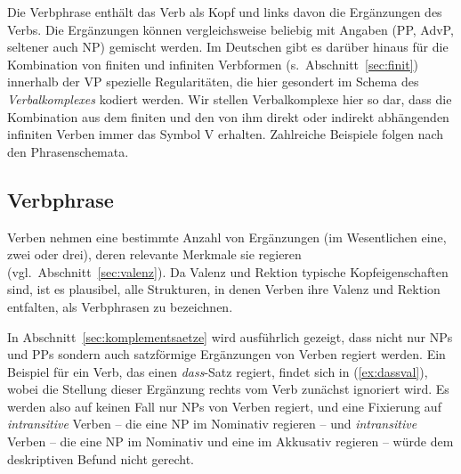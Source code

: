 \label{sec:vgr}

Die Verbphrase enthält das Verb als Kopf und links davon die Ergänzungen des Verbs.
Die Ergänzungen können vergleichsweise beliebig mit Angaben (PP, AdvP, seltener auch NP) gemischt werden.
Im Deutschen gibt es darüber hinaus für die Kombination von finiten und infiniten Verbformen (s.\ Abschnitt~\ref{sec:finit}) innerhalb der VP spezielle Regularitäten, die hier gesondert im Schema des \textit{Verbalkomplexes} kodiert werden.
Wir stellen Verbalkomplexe hier so dar, dass die Kombination aus dem finiten und den von ihm direkt oder indirekt abhängenden infiniten Verben immer das Symbol V erhalten.
Zahlreiche Beispiele folgen nach den Phrasenschemata.





\subsection{Verbphrase}

\label{sec:verbphrase}


Verben nehmen eine bestimmte Anzahl von Ergänzungen (im Wesentlichen eine, zwei oder drei), deren relevante Merkmale sie regieren (vgl.\ Abschnitt~\ref{sec:valenz}).
Da Valenz und Rektion typische Kopfeigenschaften sind, ist es plausibel, alle Strukturen, in denen Verben ihre Valenz und Rektion entfalten, als Verbphrasen zu bezeichnen.

\begin{exe}
\end{exe}

In Abschnitt~\ref{sec:komplementsaetze} wird ausführlich gezeigt, dass nicht nur NPs und PPs sondern auch satzförmige Ergänzungen von Verben regiert werden.
Ein Beispiel für ein Verb, das einen \textit{dass}-Satz regiert, findet sich in (\ref{ex:dassval}), wobei die Stellung dieser Ergänzung rechts vom Verb zunächst ignoriert wird.
Es werden also auf keinen Fall nur NPs von Verben regiert, und eine Fixierung auf \textit{intransitive} Verben -- die eine NP im Nominativ regieren -- und \textit{intransitive} Verben -- die eine NP im Nominativ und eine im Akkusativ regieren -- würde dem deskriptiven Befund nicht gerecht.

